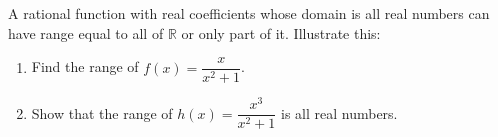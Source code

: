 A rational function with real coefficients whose domain is all real numbers can have range equal to all of \(\mathbb{R}\) or only part of it. Illustrate this:
\begin{enumerate}
\item[(a)] Find the range of \(f(x)=\dfrac{x}{x^2+1}\).
\item[(b)] Show that the range of \(h(x)=\dfrac{x^3}{x^2+1}\) is all real numbers.
\end{enumerate}
